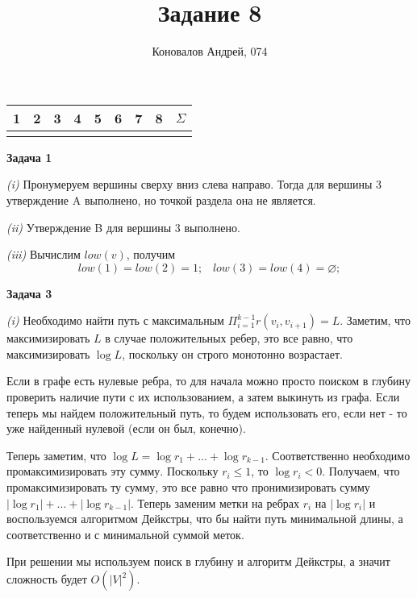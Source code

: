 \documentclass[10pt]{article}
\title{Задание 8}
\author{Коновалов Андрей, 074}
\date{}
\begin{document}
\maketitle

\noindent
\begin{tabularx}{\textwidth}{|C|C|C|C|C|C|C|C|C|}
   & 2 & 3 & 4 & 5 & 6 & 7 & 8 & $\Sigma$ \\
  \hline
  &&&&&&&& \\
  \hline
\end{tabularx}

\bigskip

{\bf Задача 1}

{\it (i)}
Пронумеруем вершины сверху вниз слева направо.
Тогда для вершины $3$ утверждение A выполнено, но точкой раздела она не является.

\smallskip

{\it (ii)}
Утверждение B для вершины $3$ выполнено.

\smallskip

{\it (iii)}
Вычислим $low(v)$, получим
$$
  low(1) = low(2) = 1; \;\;\; low(3) = low(4) = \varnothing;
$$

\medskip

{\bf Задача 3}

{\it (i)}
Необходимо найти путь с максимальным $\Pi_{i = 1}^{k - 1} r(v_i, v_{i + 1}) = L$.
Заметим, что максимизировать $L$ в случае положительных ребер, это все равно, что максимизировать $\log{L}$, поскольку он строго монотонно возрастает.

Если в графе есть нулевые ребра, то для начала можно просто поиском в глубину проверить наличие пути с их использованием, а затем выкинуть из графа.
Если теперь мы найдем положительный путь, то будем использовать его, если нет - то уже найденный нулевой (если он был, конечно).

Теперь заметим, что $\log{L} = \log{r_1} + ... + \log{r_{k - 1}}$.
Соответственно необходимо промаксимизировать эту сумму.
Поскольку $r_i \leq 1$, то $\log{r_i} < 0$.
Получаем, что промаксимизировать ту сумму, это все равно что пронимизировать сумму $|\log{r_1}| + ... + |\log{r_{k - 1}}|$.
Теперь заменим метки на ребрах $r_i$ на $|\log{r_i}|$ и воспользуемся алгоритмом Дейкстры, что бы найти путь минимальной длины, а соответственно и с минимальной суммой меток.

При решении мы используем поиск в глубину и алгоритм Дейкстры, а значит сложность будет $O(|V|^2)$.
\end{document}
